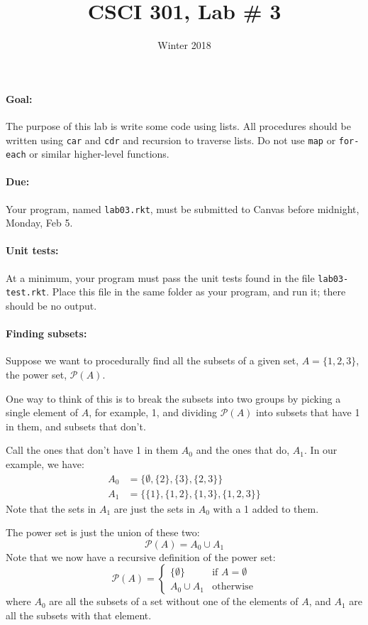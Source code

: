 \documentclass{article}
\title{CSCI 301, Lab \# 3}
\author{Winter 2018}
\date{}
\newcommand{\set}[1]{\ensuremath{\{#1\}}}
\newcommand{\power}[1]{\ensuremath{\mathcal{P}(#1)}}
\begin{document}
\maketitle


\paragraph{Goal:} The purpose of this lab is write some  code 
 using lists.  All procedures should be written using {\tt car} and
 {\tt cdr} and recursion to traverse lists.  Do not use {\tt map} or
 {\tt for-each} or similar higher-level functions.

\paragraph{Due:} Your program, named {\tt lab03.rkt}, must be submitted to
  Canvas before midnight, Monday, Feb 5.

  \paragraph{Unit tests:}
  At a minimum, your program must pass the unit tests found in the
  file {\tt lab03-test.rkt}.  Place this file in the same folder
  as your program, and run it;  there should be no output.

\paragraph{Finding subsets:}  Suppose we want to procedurally find all
the subsets of a given set, $A=\set{1,2,3}$, the power set,
$\mathcal{P}(A)$.

One way to think of this is to break the subsets
into two groups by picking a single element of $A$, for example, 1,
and dividing \power{A} into subsets that have 1 in them, and subsets that
don't.

Call the ones that don't have 1 in them $A_0$ and the ones
that do, $A_1$.  In our example, we have:
\begin{align*}
A_0 &= \set{\emptyset,\set{2},\set{3},\set{2,3}}\\
A_1 &= \set{\set{1},\set{1,2},\set{1,3},\set{1,2,3}}
\end{align*}
Note that the sets in $A_1$ are just the sets in $A_0$ with a 1 added
to them.

The power set is just the union of these two:
\[
\power{A} = A_0 \cup A_1
\]
Note that we now have a recursive definition of the power set:
\[
\power{A} = \left\{\begin{array}{ll}
\set{\emptyset} & \mbox{if $A=\emptyset$}\\
A_0 \cup A_1 & \mbox{otherwise}
\end{array}\right.
\]
where $A_0$ are all the subsets of a set without one of the elements
of $A$, and $A_1$ are all the subsets with that element.
\end{document}

